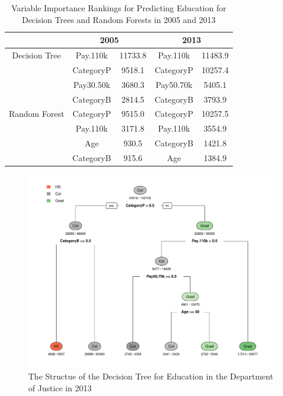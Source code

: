 \documentclass{article}
\begin{document}
    \begin{center}
        \begin{table}
            \centering
            \begin{tabular}{ |c|c|c|c|c| }
                \hline
                & \multicolumn{2}{|c|}{2005} & \multicolumn{2}{|c|}{2013} \\
                \hline
                Decision Tree & Pay.110k & 11733.8 & Pay.110k & 11483.9 \\
                & CategoryP & 9518.1 & CategoryP & 10257.4 \\
                & Pay30.50k & 3680.3 & Pay50.70k & 5405.1 \\
                & CategoryB & 2814.5 & CategoryB & 3793.9 \\
                \hline
                Random Forest & CategoryP & 9515.0 & CategoryP & 10257.5 \\
                & Pay.110k & 3171.8 & Pay.110k & 3554.9 \\
                & Age & 930.5 & CategoryB & 1421.8 \\
                & CategoryB & 915.6 & Age & 1384.9 \\
                \hline
            \end{tabular}
            \caption{Variable Importance Rankings for Predicting Education for Decision Trees and Random Forests in 2005 and 2013}
            \label{tab:10}
        \end{table}
    \end{center}

    \begin{center}
        \begin{figure}
            \includegraphics[scale=0.4]{./images/edu-decision-tree-2013.pdf}
            \caption{The Structue of the Decision Tree for Education in the Department of Justice in 2013}
            \label{edudesctree2013}
        \end{figure}
    \end{center}
\end{document}
